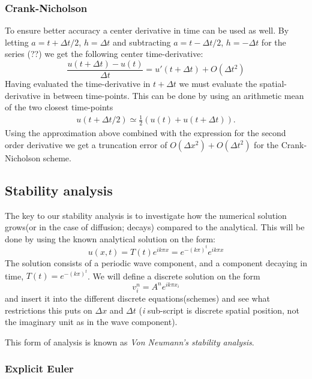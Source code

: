 \documentclass[11pt,a4paper,draft]{article}
\numberwithin{equation}{section}
\begin{document}
\subsubsection{Crank-Nicholson}
To ensure better accuracy a center derivative in time can be used as well. By letting $a=t+\Delta t/2$, $h=\Delta t$ and subtracting $a=t-\Delta t/2$, $h=-\Delta t$ for the series (??) we get the following center time-derivative:
\begin{equation}
\frac{u(t + \Delta t)-u(t)}{\Delta t} = u'(t+\Delta t) + O(\Delta t^2)
\end{equation}
Having evaluated the time-derivative in $t+\Delta t$ we must evaluate the spatial-derivative in between time-points. This can be done by using an arithmetic mean of the two closest time-points
\begin{align*}
u(t+\Delta t/2) \simeq \frac{1}{2}(u(t)+u(t+\Delta t)).
\end{align*}
Using the approximation above combined with the expression for the second order derivative we get a truncation error of $O(\Delta x^2)+O(\Delta t^2)$ for the Crank-Nicholson scheme. 


\subsection{Stability analysis}

The key to our stability analysis is to investigate how the numerical solution grows(or in the case of diffusion; decays) compared to the analytical. This will be done by using the known analytical solution on the form:
\begin{equation}
u(x,t) = T(t)e^{ik \pi x} = e^{-(k\pi)^t}e^{ik \pi x}
\end{equation}
The solution consists of a periodic wave component, and a component decaying in time, $T(t)=e^{-(k\pi)^t}$. We will define a discrete solution on the form
\begin{equation}
v^n_i = A^n e^{ik \pi x_i}
\end{equation}
and insert it into the different discrete equations(schemes) and see what restrictions this puts on $\Delta x$ and $\Delta t$ (\emph{i} sub-script is discrete spatial position, not the imaginary unit as in the wave component).

This form of analysis is known as \emph{Von Neumann's stability analysis}.

\subsubsection{Explicit Euler}
\end{document}
